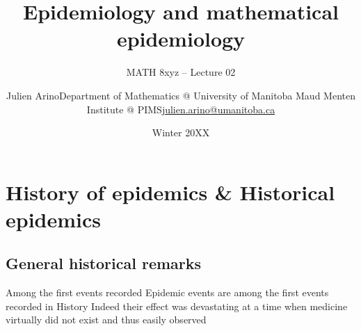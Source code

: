\documentclass[aspectratio=169]{beamer}\usepackage[]{graphicx}\usepackage[]{xcolor}
\subtitle{MATH 8xyz -- Lecture 02}
\author{\texorpdfstring{Julien Arino\newline Department of Mathematics @ University of Manitoba \newline Maud Menten Institute @ PIMS\newline\url{julien.arino@umanitoba.ca}}{Julien Arino}}
\date{Winter 20XX}
\title{Epidemiology and mathematical epidemiology}
\begin{document}


\section{History of epidemics \& Historical epidemics}

\subsection{General historical remarks}
\begin{frame}{Among the first events recorded}
\bbullet Epidemic events are among the first events recorded in History
\vfill
\bbullet Indeed their effect was devastating at a time when medicine virtually did not exist and thus easily observed
\end{frame}
\end{document}
